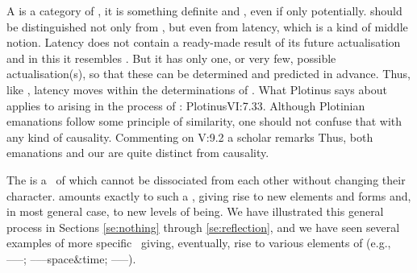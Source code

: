 {  A  is a category of
  , it is something definite and , even if only
  potentially.
   should be distinguished not only from , but
  even from latency, which is a kind of middle notion. Latency does not contain
  a ready-made result of its future actualisation and in this it resembles
  . But it has only one, or very few, possible actualisation(s),
  so that these can be determined and predicted in advance. Thus, like
  , latency moves within the determinations of
  . \label{ftnt:artist} }
%
What Plotinus says about  applies to  arising in the
process of : \citet{Form is only a trace of that which has no
  form: indeed, it is the latter which engenders form.}{Plotinus}{VI:7.33.
  Although Plotinian emanations follow some principle of
  similarity, one should not confuse that with any kind of
  causality. Commenting on
  V:9.2   a scholar remarks
   Thus, both
  emanations and our  are quite distinct
  from causality.}

\pa\label{pa:nexus}
The  is a \nexus\ of  which cannot be
{dissociated} from each other without changing their
character.  amounts exactly to such a ,
giving rise to new elements and forms and, in most general case, to new levels
of being. We have illustrated this general process in Sections \ref{se:nothing}
through \ref{se:reflection}, and we have seen several examples of more specific
\nexuss\ giving, eventually, rise to various elements of
 (e.g., ------;
------space\&time;
------).

